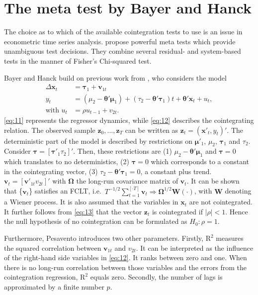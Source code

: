 \documentclass[12pt,a4paper]{article}
\begin{document}
\hypertarget{the-meta-test-by-bayer-and-hanck}{%
\section{The meta test by Bayer and
Hanck}\label{the-meta-test-by-bayer-and-hanck}}

The choice as to which of the available cointegration tests to use is an
issue in econometric time series analysis. \textcite{Bayerhanck_2012}
propose powerful meta tests which provide unambiguous test decisions.
They combine several residual- and system-based tests in the manner of
Fisher's \autocite*{Fisher_1932} Chi-squared test.

Bayer and Hanck build on previous work from \textcite{Pesavento_2004},
who considers the model \begin{align}
\Delta \bm{x}_t &= \bm{\tau}_1 + \bm{v}_{1t} \label{eq:11} \\
y_t &= (\mu_2 - \bm{\theta}' \bm{\mu}_1) + (\tau_2 - \bm{\theta}' \bm{\tau}_1) t + \bm{\theta}' \bm{x}_t + u_t, \label{eq:12} \\
\text{with } u_t &= \rho u_{t-1} + v_{2t}. \label{eq:13}
\end{align} \eqref{eq:11} represents the regressor dynamics, while
\eqref{eq:12} describes the cointegrating relation. The observed sample
\(\mathbf{z}_0,..., \mathbf{z}_T\) can be written as
\(\mathbf{z}_t = (\mathbf{x}'_t, y_t)'\). The deterministic part of the
model is described by restrictions on \(\bm{\mu}'_1\), \(\mu_2\),
\(\bm{\tau}_1\) and \(\tau_2\). Consider
\(\bm{\tau} = [\bm{\tau}'_1 \tau_2]'\). Then, these restrictions are (1)
\(\mu_2 - \bm{\theta}' \bm{\mu}_1\) and \(\bm{\tau} = 0\) which
translates to no deterministics, (2) \(\bm{\tau} = 0\) which corresponds
to a constant in the cointegrating vector, (3)
\(\tau_2 - \bm{\theta}' \bm{\tau}_1 = 0\), a constant plus trend.
\(\bm{v}_t = [\bm{v}'_{1t} v_{2t}]'\) with \(\bm{\Omega}\) the long-run
covariance matrix of \(\bm{v}_t\). It can be shown that \{\(\bm{v}_t\)\}
satisfies an \ac{FCLT},
i.e.~\(T^{-1/2} \sum^{[\cdot T]}_{t=1} \bm{v}_t \Rightarrow \bm{\Omega}^{1/2} \bm{W}(\cdot)\),
with \(\bm{W}\) denoting a Wiener process. It is also assumed that the
variables in \(\mathbf{x}_t\) are not cointegrated. It further follows
from \eqref{eq:13} that the vector \(\mathbf{z}_t\) is cointegrated if
\(|\rho| < 1\). Hence the null hypothesis of no cointegration can be
formulated as \(H_0: \rho = 1\).

Furthermore, Pesavento introduces two other parameters. Firstly,
\(\text{R}^2\) measures the squared correlation between \(\bm{v}_{1t}\)
and \(v_{2t}\). It can be interpreted as the influence of the right-hand
side variables in \eqref{eq:12}. It ranks between zero and one. When
there is no long-run correlation between those variables and the errors
from the cointegration regression, \(\text{R}^2\) equals zero. Secondly,
the number of lags is approximated by a finite number \(p\).
\end{document}
